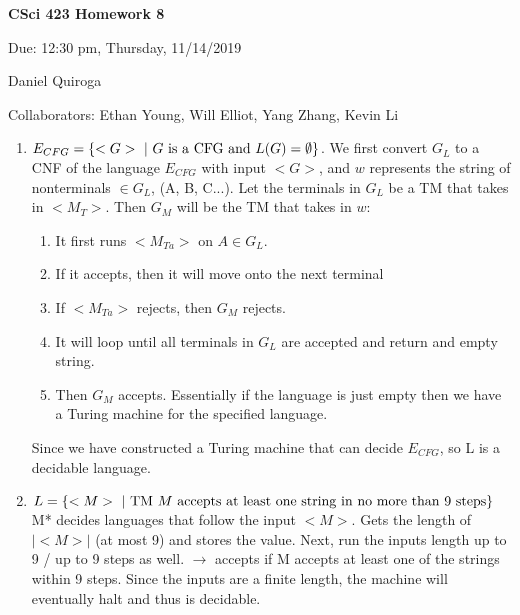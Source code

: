 \documentclass[11pt]{article}
\begin{document}
\begin{LARGE}
\centerline {\bf CSci 423 Homework 8}
\end{LARGE}
\vskip 0.25cm

\centerline{Due: 12:30 pm, Thursday, 11/14/2019}
\centerline{Daniel Quiroga}
Collaborators: Ethan Young, Will Elliot, Yang Zhang, Kevin Li
\begin{enumerate}

\item $E_{CFG}=\{<G>\ |\ G{\rm\ is\ a\ CFG}{\rm\ and\ }L(G)=\emptyset\}$.\newline
We first convert $G_L$ to a CNF of the language $E_{CFG}$ with input $<G>$, and $w$ represents the string of nonterminals $\in G_L$, (A, B, C...).\newline
Let the terminals in $G_L$ be a TM that takes in $<M_T>$.\newline
Then $G_M$ will be the TM that takes in $w$:
\begin{enumerate}
\item It first runs $<M_{Ta}>$ on $A \in G_L$.
\item If it accepts, then it will move onto the next terminal
\item If $<M_{Ta}>$ rejects, then $G_M$ rejects.
\item It will loop until all terminals in $G_L$ are accepted and return and empty string.
\item Then $G_M$ accepts. Essentially if the language is just empty then we have a Turing machine for the specified language. 
\end{enumerate}
Since we have constructed a Turing machine that can decide $E_{CFG}$, so L is a decidable language.




\item $L=\{<M>\ |\ {\rm TM\ }M {\rm\ accepts\ at\ least\ one\ string\ in\ no\ more\ than\ 9\ steps}\}$\newline
M* decides languages that follow the input $<M>$. Gets the length of $|<M>|$ (at most 9) and stores the value. \newline 
Next, run the inputs length up to 9 / up to 9 steps as well. $\rightarrow$ accepts if M accepts at least one of the strings within 9 steps. \newline 
Since the inputs are a finite length, the machine will eventually halt and thus is decidable. 



\end{enumerate}
\end{document}
